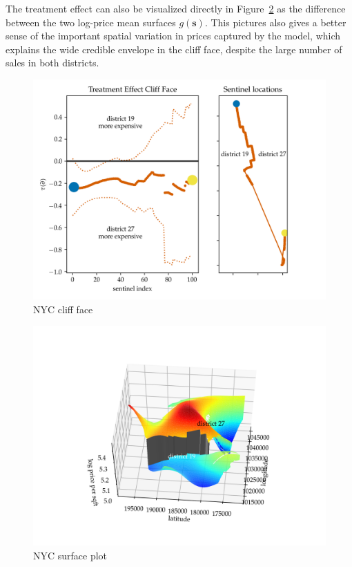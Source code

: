 \documentclass[letter]{article}
\makeatletter
\def\maxwidth{\ifdim\Gin@nat@width>\linewidth\linewidth
\else\Gin@nat@width\fi}
\let\Oldincludegraphics\includegraphics
\renewcommand{\includegraphics}[1]{\Oldincludegraphics[width=1.0\maxwidth]{#1}}
\newcommand{\svec}{\mathbold{s}}
\makeatother
\begin{document}
The treatment effect can also be visualized directly in Figure~\ref{fig:NYC_3d} as the difference between the two log-price mean surfaces \(g(\svec)\). This pictures also gives a better sense of the important spatial variation in prices captured by the model, which explains the wide credible envelope in the cliff face, despite the large number of sales in both districts.
    


    	\begin{figure}
\centering
\includegraphics{../NYC/NYC_plots/NYC_cliff_face.png}
\caption{\label{fig:NYC_cliff_face}NYC cliff face}
\end{figure}
    


    	\begin{figure}
\centering
\includegraphics{../NYC/NYC_plots/NYC_surface_plot_multi.png}
\caption{\label{fig:NYC_3d}NYC surface plot}
\end{figure}
    
\end{document}
